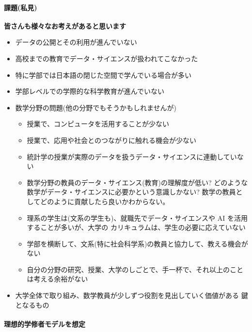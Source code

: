 \documentclass[
]{bxjsbook}
\providecommand{\tightlist}{%
  \setlength{\itemsep}{0pt}\setlength{\parskip}{0pt}}
\theoremstyle{definition}
\theoremstyle{definition}
\theoremstyle{definition}
\theoremstyle{definition}
\theoremstyle{remark}
\begin{document}
\hypertarget{ux8ab2ux984cux79c1ux898b}{%
\paragraph{課題(私見)}\label{ux8ab2ux984cux79c1ux898b}}

\textbf{皆さんも様々なお考えがあると思います}

\begin{itemize}
\item
  データの公開とその利用が進んでいない
\item
  高校までの教育でデータ・サイエンスが扱われてこなかった
\item
  特に学部では日本語の閉じた空間で学んでいる場合が多い
\item
  学部レベルでの学際的な科学教育が進んでいない
\item
  数学分野の問題(他の分野でもそうかもしれませんが)

  \begin{itemize}
  \tightlist
  \item
    授業で、コンピュータを活用することが少ない
  \item
    授業で、応用や社会とのつながりに触れる機会が少ない
  \item
    統計学の授業が実際のデータを扱うデータ・サイエンスに連動していない
  \item
    数学分野の教員のデータ・サイエンス(教育)の理解度が低い?
    どのような数学がデータ・サイエンスに必要かという意識しかない?
    数学の教員としてどのように貢献したら良いかわからない。
  \item
    理系の学生は(文系の学生も)、就職先でデータ・サイエンスや AI を活用することが多いが、大学の カリキュラムは、学生の必要に応えていない
  \item
    学部を横断して、文系(特に社会科学系)の教員と協力して、教える機会がない
  \item
    自分の分野の研究、授業、大学のしごとで、手一杯で、それ以上のことは考える余裕がない
  \end{itemize}
\item
  大学全体で取り組み、数学教員が少しずつ役割を見出していく価値がある 鍵となるもの
\end{itemize}

\hypertarget{ux7406ux60f3ux7684ux5b66ux4feeux8005ux30e2ux30c7ux30ebux3092ux60f3ux5b9a}{%
\paragraph{理想的学修者モデルを想定}\label{ux7406ux60f3ux7684ux5b66ux4feeux8005ux30e2ux30c7ux30ebux3092ux60f3ux5b9a}}
\end{document}
